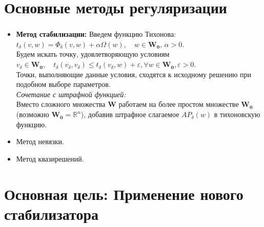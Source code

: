 \documentclass[unicode, t, 11pt]{beamer}%
\begin{document}
\section{Основные методы регуляризации}
\begin{frame}
\frametitle{\insertsection}
\begin{itemize}[label=\(\bullet\)]
	\item\textbf{Метод стабилизации:} Введем функцию Тихонова: $t_{\delta} (v,w)=\Phi_{\delta}(v,w)+\alpha \Omega(w),\quad w\in \mathbf{W_0},\,\alpha>0$.\\
	Будем искать точку, удовлетворяющую условиям
	$v_{\delta}\in \mathbf{W_0},\quad t_{\delta}(v_\delta,v_\delta)\leqslant t_{\delta}(v_{\delta},w)+\varepsilon,\forall w\in\mathbf{W_0},\varepsilon>0.$\\
	Точки, выполняющие данные условия, сходятся к исходному решению при подобном выборе параметров.\\
	\emph{Сочетание с штрафной функцией:}\\
	Вместо сложного множества $\mathbf{W}$ работаем на более простом множестве $\mathbf{W_0}$ (возможно $\mathbf{W_0}=\mathbb{R}^n$), добавив штрафное слагаемое $AP_{\delta}(w)$ в тихоновскую функцию.
	\item Метод невязки.
	\item Метод квазирешений.
\end{itemize}
\end{frame}

\section{Основная цель: Применение нового стабилизатора}
\end{document}
